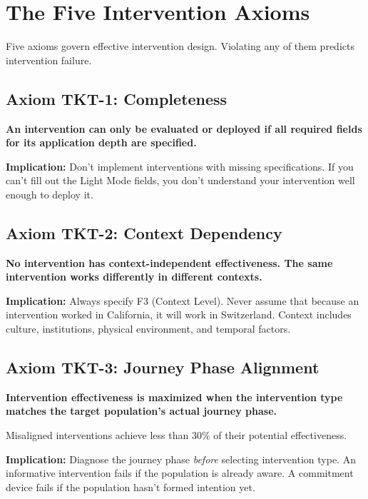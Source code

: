 \section{The Five Intervention Axioms}
\label{sec:17-axioms}

Five axioms govern effective intervention design. Violating any of them predicts intervention failure.

\subsection{Axiom TKT-1: Completeness}

\begin{tcolorbox}[colback=gray!5!white, colframe=gray!75!black,
    title=Axiom TKT-1: Intervention Completeness]
\textbf{An intervention can only be evaluated or deployed if all required fields for its application depth are specified.}

\textbf{Implication:} Don't implement interventions with missing specifications. If you can't fill out the Light Mode fields, you don't understand your intervention well enough to deploy it.
\end{tcolorbox}

\subsection{Axiom TKT-2: Context Dependency}

\begin{tcolorbox}[colback=gray!5!white, colframe=gray!75!black,
    title=Axiom TKT-2: Context Dependency]
\textbf{No intervention has context-independent effectiveness. The same intervention works differently in different contexts.}

\textbf{Implication:} Always specify F3 (Context Level). Never assume that because an intervention worked in California, it will work in Switzerland. Context includes culture, institutions, physical environment, and temporal factors.
\end{tcolorbox}

\subsection{Axiom TKT-3: Journey Phase Alignment}

\begin{tcolorbox}[colback=gray!5!white, colframe=gray!75!black,
    title=Axiom TKT-3: Journey Phase Alignment]
\textbf{Intervention effectiveness is maximized when the intervention type matches the target population's actual journey phase.}

Misaligned interventions achieve less than 30\% of their potential effectiveness.

\textbf{Implication:} Diagnose the journey phase \textit{before} selecting intervention type. An informative intervention fails if the population is already aware. A commitment device fails if the population hasn't formed intention yet.
\end{tcolorbox}

